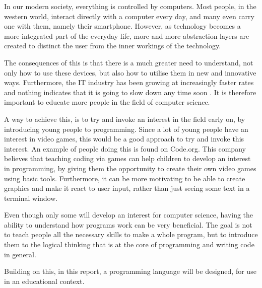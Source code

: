 \begin{comment}
A method to reach this, is to try and invoke an interest in the field early on, by introducing children to programming. Since a lot of children have an interest in video games, we believe that this can help to develop this wanted interest, by giving them the opportunity to create their own video games with basic tools. Furthermore, it is more motivating to be able to create graphics and make it react to what you type, rather than just seeing some text in a terminal window.








it is not needed to be able to write code but just the way of thinking behind it. This can give a lot of benefits to children and adults in the way they approach a problem, where they have a big problem that they keep on making into smaller and smaller problems so they end up with having a lot of small and easy-to-understand problems, or the way they work around a problem with lot more logical approach. 

\end{comment}




In our modern society, everything is controlled by computers. Most people, in the western world, interact directly with a computer every day, and many even carry one with them, namely their smartphone\citep{geny}. However, as technology becomes a more integrated part of the everyday life, more and more abstraction layers are created to distinct the user from the inner workings of the technology.

The consequences of this is that there is a much greater need to understand, not only how to use these devices, but also how to utilise them in new and innovative ways. Furthermore, the IT industry has been growing at increasingly faster rates and nothing indicates that it is going to slow down any time soon \citep{BLSGrowth}. It is therefore important to educate more people in the field of computer science.

A way to achieve this, is to try and invoke an interest in the field early on, by introducing young people to programming. Since a lot of young people have an interest in video games, this would be a good approach to try and invoke this interest. An example of people doing this is found on Code.org\citep{codeorg}. This company believes that teaching coding via games can help children to develop an interest in programming, by giving them the opportunity to create their own video games using basic tools. Furthermore, it can be more motivating to be able to create graphics and make it react to user input, rather than just seeing some text in a terminal window.

Even though only some will develop an interest for computer science, having the ability to understand how programs work can be very beneficial. The goal is not to teach people all the necessary skills to make a whole program, but to introduce them to the logical thinking that is at the core of programming and writing code in general. \citep{Sitepoint2015}


Building on this, in this report, a programming language will be designed, for use in an educational context.